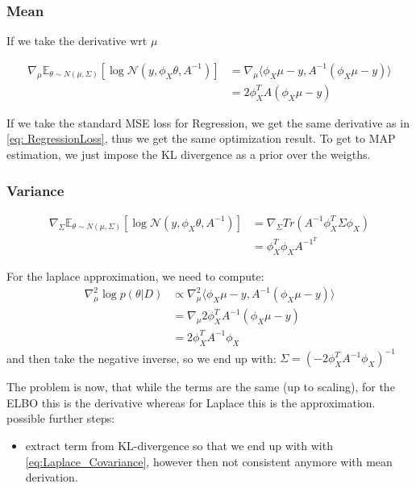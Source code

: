 \documentclass[a4paper]{scrartcl}
\begin{document}
    \subsubsection{Mean}
      If we take the derivative wrt $\mu$

      \begin{align}
        \nabla_{\mu} \mathbb{E}_{\theta \sim N(\mu, \Sigma)} [\log{\mathcal{N}(y, \phi_{X}\theta, A^{-1})}]
        &=\nabla_{\mu} \langle \phi_{X} \mu - y, A^{-1} (\phi_{X} \mu -y) \rangle \label{eq: RegressionLoss}\\ 
        &= 2 \phi_X^T A (\phi_{X} \mu - y) \label{eq:ClosedForm_Mean}
      \end{align}

      If we take the standard MSE loss for Regression, we get the same derivative
      as in \ref{eq: RegressionLoss}, thus we get the same optimization result. To
      get to MAP estimation, we just impose the KL divergence as a prior over the
      weigths.
    
    \subsubsection{Variance}

      \begin{align}
        \nabla_\Sigma \mathbb{E}_{\theta \sim N(\mu, \Sigma)} [\log{\mathcal{N}(y, \phi_{X}\theta, A^{-1})}]
        &= \nabla_\Sigma Tr(A^{-1} \phi_X^T \Sigma \phi_X)\\
        &= \phi_X^T \phi_X A^{-1^T}
      \end{align}

      For the laplace approximation, we need to compute:
      \begin{align}
        \nabla^2_{\mu} \log p(\theta \vert D)
        &\propto \nabla^2_{\mu} \langle \phi_X \mu - y, A^{-1} (\phi_X \mu -y) \rangle \\
        &= \nabla_{\mu} 2 \phi_X^T A^{-1} (\phi_X\mu - y)\\
        &= 2 \phi_X^T A^{-1} \phi_X \label{eq:Laplace_Covariance}
      \end{align}
      and then take the negative inverse, so we end up with:
      $\Sigma = (- 2 \phi_X^T A^{-1} \phi_X )^{-1}$

      The problem is now, that while the terms are the same (up to scaling), for the
      ELBO this is the derivative whereas for Laplace this is the approximation.
      possible further steps:
      \begin{itemize}
        \item extract term from KL-divergence so that we end up with with \ref{eq:Laplace_Covariance}, however then not consistent anymore with mean derivation.
      \end{itemize}
\end{document}
